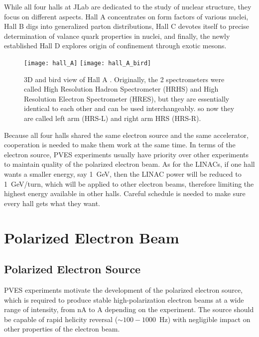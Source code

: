 While all four halls at JLab are dedicated to the study of nuclear structure, they
focus on different aspects. Hall A concentrates on form factors of various nuclei, 
Hall B digs into generalized parton distributions, Hall C devotes itself to precise
determination of valance quark properties in nuclei, and finally, the newly 
established Hall D explores origin of confinement through exotic mesons.
\begin{figure}[h!]
    \centering
    \texttt{[image: hall\_A]}
    \texttt{[image: hall\_A\_bird]}
    \caption{3D and bird view of Hall A \cite{halla_manual}. Originally, the 2 spectrometers
    were called High Resolution Hadron Spectrometer (HRHS) and High Resolution Electron
    Spectrometer (HRES), but they are essentially identical to each other and
    can be used interchangeably.
    so now they are called left arm (HRS-L) and right arm HRS (HRS-R).
    }
\end{figure}

Because all four halls shared the same electron source and the same accelerator, 
cooperation is needed to make them work at the same time. In terms of the electron
source, PVES experiments usually have priority over other experiments to maintain 
quality of the polarized electron beam. As for the LINACs, if one hall wants
a smaller energy, say 1~GeV, then the LINAC power will be reduced to 1~GeV/turn,
which will be applied to other electron beams, therefore limiting the 
highest energy available in other halls. Careful schedule is needed to make sure
every hall gets what they want.
\section{Polarized Electron Beam}

\subsection{Polarized Electron Source}
PVES experiments motivate the development of the polarized electron source, which 
is required to produce stable high-polarization electron beams at a wide range of intensity, 
from nA to A depending on the experiment. The source should be capable of rapid helicity
reversal ($\sim 100-1000$~Hz) with negligible impact on other properties of the electron beam.


